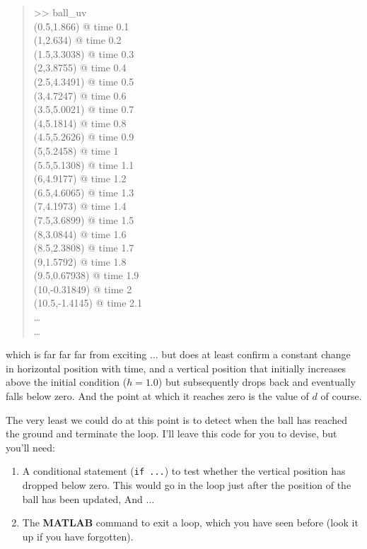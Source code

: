 \documentclass{tufte-book} %
\newenvironment{docspecmargin}{\begin{quotation}\ttfamily\footnotesize\parskip0pt\parindent0pt\ignorespaces}{\end{quotation}}
\begin{document}
\begin{docspecmargin}
>> ball\_uv
\\(0.5,1.866) @ time 0.1
\\(1,2.634) @ time 0.2
\\(1.5,3.3038) @ time 0.3
\\(2,3.8755) @ time 0.4
\\(2.5,4.3491) @ time 0.5
\\(3,4.7247) @ time 0.6
\\(3.5,5.0021) @ time 0.7
\\(4,5.1814) @ time 0.8
\\(4.5,5.2626) @ time 0.9
\\(5,5.2458) @ time 1
\\(5.5,5.1308) @ time 1.1
\\(6,4.9177) @ time 1.2
\\(6.5,4.6065) @ time 1.3
\\(7,4.1973) @ time 1.4
\\(7.5,3.6899) @ time 1.5
\\(8,3.0844) @ time 1.6
\\(8.5,2.3808) @ time 1.7
\\(9,1.5792) @ time 1.8
\\(9.5,0.67938) @ time 1.9
\\(10,-0.31849) @ time 2
\\(10.5,-1.4145) @ time 2.1
\\ \ldots 
\\ \ldots 
\end{docspecmargin}
which is far far far from exciting ... but does at least confirm a constant change in horizontal position with time, and a vertical position that initially increases above the initial condition (\(h=1.0\)) but subsequently drops back and eventually falls below zero. And the point at which it reaches zero is the value of \(d\) of course.

The very least we could do at this point is to detect when the ball has reached the ground and terminate the loop. I'll leave this code for you to devise, but you'll need:
\begin{enumerate}[noitemsep]
\setlength{\itemindent}{.2in}
\item A conditional statement (\texttt{if ...}) to test whether the vertical position has dropped below zero. This would go in the loop just after the position of the ball has been updated, And ...
\item The \textbf{MATLAB} command to exit a loop, which you have seen before (look it up if you have forgotten).
\end{enumerate}
\end{document}
